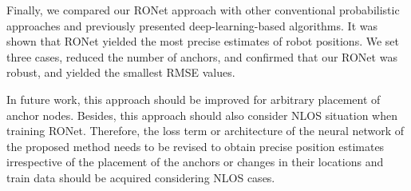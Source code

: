\documentclass[letterpaper, 10 pt, conference]{ieeeconf}
\begin{document}
Finally, we compared our RONet approach with other conventional probabilistic approaches and previously presented deep-learning-based algorithms. It was shown that RONet yielded the most precise estimates of robot positions. We set three cases, reduced the number of anchors, and confirmed that our RONet was robust, and yielded the smallest RMSE values. 

In future work, this approach should be improved for arbitrary placement of anchor nodes. Besides, this approach should also consider NLOS situation when training RONet. Therefore, the loss term or architecture of the neural network of the proposed method needs to be revised to obtain precise position estimates irrespective of the placement of the anchors or changes in their locations and train data should be acquired considering NLOS cases.



\end{document}

